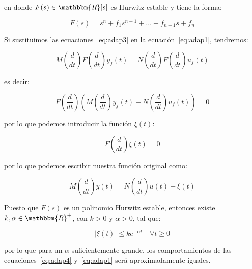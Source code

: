         en donde $F(s) \in \mathbbm{R}[s]$ es Hurwitz estable y tiene la forma:

        \begin{equation*}
            F(s) = s^n + f_1 s^{n-1} + \dots + f_{n-1} s + f_n
        \end{equation*}

        Si sustituimos las ecuaciones~\ref{eq:adap3} en la ecuación~\ref{eq:adap1}, tendremos:

        \begin{equation*}
            M \left( \frac{d}{dt} \right) F \left( \frac{d}{dt} \right) y_f (t) = N \left( \frac{d}{dt} \right) F \left( \frac{d}{dt} \right) u_f (t)
        \end{equation*}

        es decir:

        \begin{equation*}
            F \left( \frac{d}{dt} \right) \left( M \left( \frac{d}{dt} \right)  y_f (t) - N \left( \frac{d}{dt} \right) u_f (t) \right) = 0
        \end{equation*}

        por lo que podemos introducir la función $\xi(t)$:

        \begin{equation*}
            F \left( \frac{d}{dt} \right) \xi(t) = 0
        \end{equation*}

        por lo que podemos escribir nuestra función original como:

        \begin{equation} \label{eq:adap4}
            M \left( \frac{d}{dt} \right) y(t) = N \left( \frac{d}{dt} \right) u(t) + \xi(t)
        \end{equation}

        Puesto que $F(s)$ es un polinomio Hurwitz estable, entonces existe $k, \alpha \in \mathbbm{R}^+$, con $k > 0$ y $\alpha > 0$, tal que:

        \begin{equation*}
            |\xi(t)| \le k e^{- \alpha t} \quad \forall t \ge 0
        \end{equation*}


        por lo que para un $\alpha$ suficientemente grande, los comportamientos de las ecuaciones~\ref{eq:adap4} y~\ref{eq:adap1} será aproximadamente iguales.

